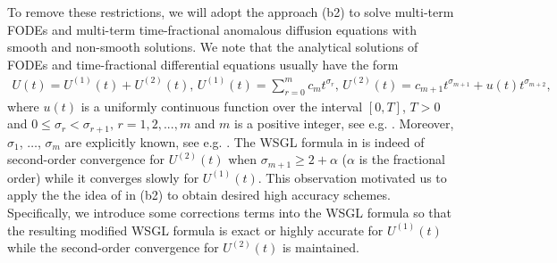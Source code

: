 \documentclass[10pt]{siamltex}
\begin{document}
To remove these restrictions, we will adopt  the approach (b2) to solve
multi-term FODEs and multi-term time-fractional anomalous diffusion equations
with smooth and non-smooth solutions. We note that
the analytical solutions of FODEs and
time-fractional differential equations  usually have the  form
\begin{eqnarray}\label{eq:ut}
U(t)=U^{(1)}(t)+U^{(2)}(t),\, U^{(1)}(t)=\sum_{r=0}^mc_mt^{\sigma_r},\,
 U^{(2)}(t)=c_{m+1}t^{\sigma_{m+1}}+u(t)t^{\sigma_{m+2}},  \quad
\end{eqnarray}
where $u(t)$ is a uniformly continuous function over the interval $[0,T]$, $T>0$ and
$0\leq \sigma_r<\sigma_{r+1},\, r=1,2,...,m$ and
$m$ is a   positive integer,
see e.g. \cite{CueLubPal06,Diethelm-B10,DieFF04,JiangLiu-etal12b,JiangLiu-etal12,LiLiu14,
Luchko11,McLMus07}. Moreover, $\sigma_1$, $\ldots$, $\sigma_m$ are explicitly known,  see e.g. \cite{Diethelm-B10,DieFF04}. The WSGL formula
in \cite{TianZD14,WangVong14b} is indeed of  second-order convergence for
$U^{(2)}(t)$ when $\sigma_{m+1}\geq2+\alpha$ ($\alpha$ is the fractional order) while it converges slowly for $U^{(1)}(t)$.
This  observation motivated us to
apply the the idea of \cite{Lub86} in  (b2) to obtain
desired high accuracy schemes.
Specifically, we introduce some corrections terms into
the  WSGL formula so that
the resulting modified WSGL formula is exact or highly accurate for $U^{(1)}(t)$
while the second-order convergence for $U^{(2)}(t)$ is maintained.


\iffalse
In order to obtain the desired numerical schemes, we first obtain the asymptotic expansions of the
error equation of the shifted GL formula.  With these asymptotic expansions,
we derive a family of second-order WSGL formulas, including  the second-order
WSGL formula from \cite{TianZD14}.
We then illustrate  that this family of second-order formulas  does not exhibit
global second-order accuracy  unless some
restrictive conditions
of vanishing  boundary values of the first-order and/or second-order derivative operators
are imposed. Subsequently,
following Lubich's approach, we recover the global second-order accuracy of the
WSGL formula by adding proper correction terms to remove those restrictions.
\fi
\end{document}

